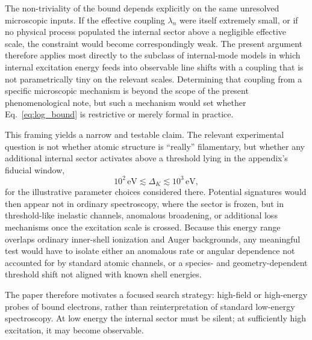 \documentclass[pdflatex,sn-mathphys-num]{sn-jnl}
\begin{document}
        The non-triviality of the bound depends explicitly on the same unresolved microscopic inputs. If the effective coupling $\lambda_n$ were itself extremely small, or if no physical process populated the internal sector above a negligible effective scale, the constraint would become correspondingly weak. The present argument therefore applies most directly to the subclass of internal-mode models in which internal excitation energy feeds into observable line shifts with a coupling that is not parametrically tiny on the relevant scales. Determining that coupling from a specific microscopic mechanism is beyond the scope of the present phenomenological note, but such a mechanism would set whether Eq.~\eqref{eq:log_bound} is restrictive or merely formal in practice.

        This framing yields a narrow and testable claim. The relevant experimental question is not whether atomic structure is ``really'' filamentary, but whether any additional internal sector activates above a threshold lying in the appendix's fiducial window,
        \begin{equation}
            10^2\,\mathrm{eV} \lesssim \Delta_K \lesssim 10^3\,\mathrm{eV},
        \end{equation}
        for the illustrative parameter choices considered there. Potential signatures would then appear not in ordinary spectroscopy, where the sector is frozen, but in threshold-like inelastic channels, anomalous broadening, or additional loss mechanisms once the excitation scale is crossed. Because this energy range overlaps ordinary inner-shell ionization and Auger backgrounds, any meaningful test would have to isolate either an anomalous rate or angular dependence not accounted for by standard atomic channels, or a species- and geometry-dependent threshold shift not aligned with known shell energies.

        The paper therefore motivates a focused search strategy: high-field or high-energy probes of bound electrons, rather than reinterpretation of standard low-energy spectroscopy. At low energy the internal sector must be silent; at sufficiently high excitation, it may become observable.

        \appendix
\end{document}
